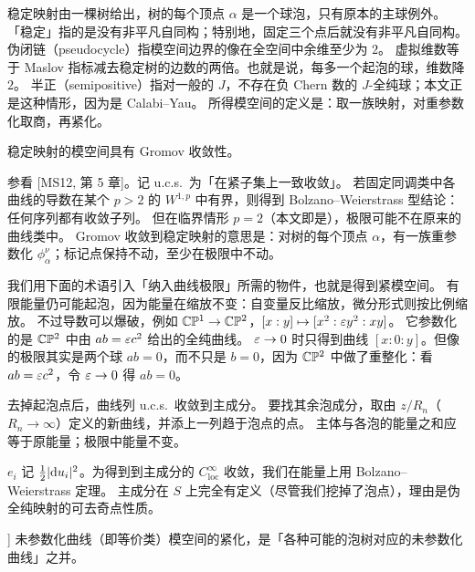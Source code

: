 \begin{definition}[稳定映射的模空间]\label{c7:def-stable-maps}
稳定映射由一棵树给出，树的每个顶点 $\alpha$ 是一个球泡，只有原本的主球例外。
「稳定」指的是没有非平凡自同构；特别地，固定三个点后就没有非平凡自同构。
伪闭链（pseudocycle）指模空间边界的像在全空间中余维至少为 $2$。
虚拟维数等于 Maslov 指标减去稳定树的边数的两倍。也就是说，每多一个起泡的球，维数降 $2$。
半正（semipositive）指对一般的 $J$，不存在负 Chern 数的 $J$-全纯球；本文正是这种情形，因为是 Calabi--Yau。
所得模空间的定义是：取一族映射，对重参数化取商，再紧化。
\end{definition}


\begin{lemma}\label{c7:lem-bolzano}
稳定映射的模空间具有 Gromov 收敛性。
\end{lemma}

参看 [MS12, 第 5 章]。记 u.c.s.\ 为「在紧子集上一致收敛」。
若固定同调类中各曲线的导数在某个 $p>2$ 的 $W^{1,p}$ 中有界，则得到 Bolzano--Weierstrass 型结论：任何序列都有收敛子列。
但在临界情形 $p=2$（本文即是），极限可能不在原来的曲线类中。
Gromov 收敛到稳定映射的意思是：对树的每个顶点 $\alpha$，有一族重参数化 $\phi^\nu_\alpha$；标记点保持不动，至少在极限中不动。

我们用下面的术语引入「纳入曲线极限」所需的物件，也就是得到紧模空间。
有限能量仍可能起泡，因为能量在缩放不变：自变量反比缩放，微分形式则按比例缩放。
不过导数可以爆破，例如 $\mathbb{C}\mathbb{P}^1\to\mathbb{C}\mathbb{P}^2$，$[x:y]\mapsto[x^2:\varepsilon y^2:xy]$。
它参数化的是 $\mathbb{C}\mathbb{P}^2$ 中由 $ab=\varepsilon c^2$ 给出的全纯曲线。
$\varepsilon\to0$ 时只得到曲线 $[x:0:y]$。但像的极限其实是两个球 $ab=0$，而不只是 $b=0$，因为 $\mathbb{C}\mathbb{P}^2$ 中做了重整化：看 $ab=\varepsilon c^2$，令 $\varepsilon\to0$ 得 $ab=0$。

去掉起泡点后，曲线列 u.c.s.\ 收敛到主成分。
要找其余泡成分，取由 $z/R_n$（$R_n\to\infty$）定义的新曲线，并添上一列趋于泡点的点。
主体与各泡的能量之和应等于原能量；极限中能量不变。

$e_i$ 记 $\frac12|\mathrm{d} u_i|^2$。为得到到主成分的 $C^\infty_{\mathrm{loc}}$ 收敛，我们在能量上用 Bolzano--Weierstrass 定理。
主成分在 $S$ 上完全有定义（尽管我们挖掉了泡点），理由是伪全纯映射的可去奇点性质。

\begin{lemma}[稳定映射的 Gromov 紧性，参看 [MS12, Equation (5.1.5)]]\label{c7:lem-gromov-compact}
未参数化曲线（即等价类）模空间的紧化，是「各种可能的泡树对应的未参数化曲线」之并。
\end{lemma}

